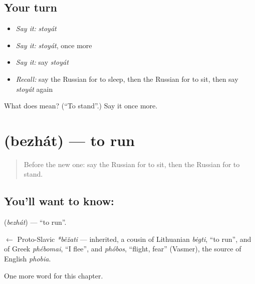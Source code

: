 \subsection*{Your turn}
\begin{itemize}
\raggedright
  \item \emph{Say it:} \emph{stoyát}
  \item \emph{Say it:} \emph{stoyát}, once more
  \item \emph{Say it:} say \emph{stoyát}
  \item \emph{Recall:} say the Russian for to sleep, then the Russian for to sit, then say \emph{stoyát} again
\end{itemize}

\begin{tcolorbox}[breakable,colback=teal!4,colframe=teal!35!black,title={Before you move on}]
What does  mean? (\textquotedblleft{}To stand\textquotedblright{}.) Say it once more.
\end{tcolorbox}
\section[\texorpdfstring{\ru{бежать} (bezhát)}{бежать (bezhát)}]{ (bezhát) — to run}

\label{lesson:RU-C40-bezhat}



\begin{quote}
Before the new one: say the Russian for to sit, then the Russian for to stand.
\end{quote}

\subsection*{You'll want to know: }
\textbf{} (\emph{bezhát}) — \textquotedblleft{}to run\textquotedblright{}.

\begin{cousinweb}
\textbf{} $\leftarrow$ Proto-Slavic \emph{*běžati} — inherited, a cousin of Lithuanian \emph{bėgti}, \textquotedblleft{}to run\textquotedblright{}, and of Greek \emph{phébomai}, \textquotedblleft{}I flee\textquotedblright{}, and \emph{phóbos}, \textquotedblleft{}flight, fear\textquotedblright{} (Vasmer), the source of English \emph{phobia}.
\end{cousinweb}

\begin{grammarlens}[title={What you've built}]
One more word for this chapter.
\end{grammarlens}

